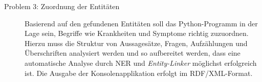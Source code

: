 \begin{description}
\item[Problem 3: Zuordnung der Entitäten]  Basierend auf den gefundenen Entitäten soll das Python-Programm in der Lage sein, Begriffe wie Krankheiten und Symptome richtig zuzuordnen. Hierzu muss die Struktur von Aussagesätze, Fragen, Aufzählungen und Überschriften analysiert werden und so aufbereitet werden, dass eine automatische Analyse durch NER und \emph{Entity-Linker} möglichst erfolgreich ist. Die Ausgabe der Konsolenapplikation erfolgt im RDF/XML-Format.

\end{description}
